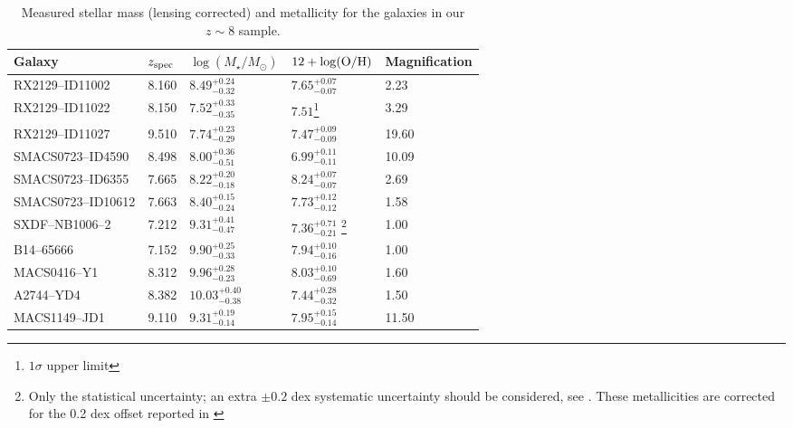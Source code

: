 \documentclass[twocolumn]{aastex631}
\makeatletter
\newcommand\footnoteref[1]{\protected@xdef\@thefnmark{\ref{#1}}\@footnotemark}
\makeatother
\begin{document}
\begin{table*}
\centering
\begin{tabular}{ |l|l|l|l|l| } 
 \hline
Galaxy & $z_{\textnormal{\scriptsize spec}}$ & $\log(M_{\star}/M_{\odot})$ & $12 + \log(\textnormal{O/H})$ & Magnification \\ 
\hline\hline
RX2129--ID11002 & 8.160 & $8.49^{+0.24}_{-0.32}$ & $7.65^{+0.07}_{-0.07}$ & 2.23\\ 
RX2129--ID11022 & 8.150 & $7.52^{+0.33}_{-0.35}$ & $7.51$\footnote{$1\sigma$ upper limit} & 3.29\\ 
RX2129--ID11027 & 9.510 & $7.74^{+0.23}_{-0.29}$ & $7.47^{+0.09}_{-0.09}$ & 19.60\\ 
SMACS0723--ID4590 & 8.498 & $8.00^{+0.36}_{-0.51}$ & $6.99^{+0.11}_{-0.11}$ & 10.09\\ 
SMACS0723--ID6355 & 7.665 & $8.22^{+0.20}_{-0.18}$ & $8.24^{+0.07}_{-0.07}$ & 2.69\\ 
SMACS0723--ID10612 & 7.663 & $8.40^{+0.15}_{-0.24}$ & $7.73^{+0.12}_{-0.12}$ & 1.58\\ 
SXDF--NB1006--2 & 7.212 & $9.31^{+0.41}_{-0.47}$ & $7.36^{+0.71}_{-0.21}$ \footnote{Only the statistical uncertainty; an extra $\pm 0.2$ dex systematic uncertainty should be considered, see \cite{jones+2020}. These metallicities are corrected for the 0.2 dex offset reported in \cite{jones+2020}\label{jones unc}} & 1.00\\ 
B14--65666 & 7.152 & $9.90^{+0.25}_{-0.33}$ & $7.94^{+0.10}_{-0.16}$ \footnoteref{jones unc} & 1.00\\ 
MACS0416--Y1 & 8.312 & $9.96^{+0.28}_{-0.23}$ & $8.03^{+0.10}_{-0.69}$ \footnoteref{jones unc} & 1.60\\ 
A2744--YD4 & 8.382 & $10.03^{+0.40}_{-0.38}$ & $7.44^{+0.28}_{-0.32}$ \footnoteref{jones unc} & 1.50\\ 
MACS1149--JD1 & 9.110 & $9.31^{+0.19}_{-0.14}$ & $7.95^{+0.15}_{-0.14}$ \footnoteref{jones unc} & 11.50\\  \hline
\end{tabular}
\caption{Measured stellar mass (lensing corrected) and metallicity for the galaxies in our $z \sim 8$ sample.}
\label{table: mass}
\end{table*}


\end{document}
